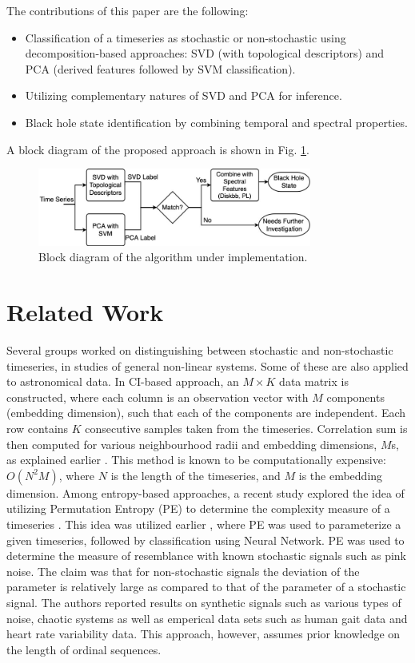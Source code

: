 \documentclass[journal]{IEEEtran}
\begin{document}
	 The contributions of this paper are the following:
	\begin{itemize}
		\item Classification of a timeseries as stochastic or non-stochastic using decomposition-based approaches: SVD (with topological descriptors) and PCA (derived features followed by SVM classification).
		\item Utilizing complementary natures of SVD and PCA for inference.
		\item Black hole state identification by combining temporal and spectral properties.
	\end{itemize}
	A block diagram of the proposed approach is shown in Fig. \ref{blockfig}.
	\begin{figure}[h]
		\centering
		\includegraphics[width=9cm]{time_series_block_diagram.jpg}
		\caption{Block diagram of the algorithm under implementation.}
		\label{blockfig}
	\end{figure}
	\section{Related Work}
	Several groups worked on distinguishing between stochastic and non-stochastic timeseries, in  studies of general non-linear systems. Some of these are also applied to astronomical data. In CI-based approach, an $M \times K$ data matrix is constructed, where each column is an observation vector with $M$ components (embedding dimension), such that each of the components are independent. Each row contains $K$ consecutive samples taken from the timeseries. Correlation sum is then computed for various neighbourhood radii and embedding dimensions, $M$s, as explained earlier \cite{CIGRacia}. This method is known to be computationally expensive: $O(N^2M)$, where $N$ is the length of the timeseries, and $M$ is the embedding dimension. Among entropy-based approaches, a recent study explored the idea of utilizing Permutation Entropy (PE) to determine the complexity measure of a timeseries \cite{Bandt2002}. This idea was utilized earlier \cite{Boaretto2021}, where PE was used to parameterize a given timeseries, followed by classification using  Neural Network. PE was used to determine the measure of resemblance with known stochastic signals such as pink noise. The claim was that for non-stochastic signals the deviation of the parameter is relatively large as compared to that of the parameter of a stochastic signal. The authors reported results on synthetic signals such as various types of noise, chaotic systems as well as emperical data sets such as human gait data and heart rate variability data. This approach, however, assumes prior knowledge on the length of ordinal sequences.
\end{document}
